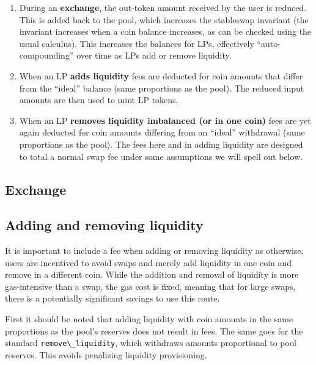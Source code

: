 \documentclass[
]{article}
\newcommand{\passthrough}[1]{#1}
\begin{document}
\begin{enumerate}
\def\labelenumi{\arabic{enumi})}
\item
  During an \textbf{exchange}, the out-token amount received by the user
  is reduced. This is added back to the pool, which increases the
  stableswap invariant (the invariant increases when a coin balance
  increases, as can be checked using the usual calculus). This increases
  the balances for LPs, effectively ``auto-compounding'' over time as
  LPs add or remove liquidity.
\item
  When an LP \textbf{adds liquidity} fees are deducted for coin amounts
  that differ from the ``ideal'' balance (same proportions as the pool).
  The reduced input amounts are then used to mint LP tokens.
\item
  When an LP \textbf{removes liquidity imbalanced (or in one coin)} fees
  are yet again deducted for coin amounts differing from an ``ideal''
  withdrawal (same proportions as the pool). The fees here and in adding
  liquidity are designed to total a normal swap fee under some
  assumptions we will spell out below.
\end{enumerate}

\hypertarget{exchange}{%
\subsection{Exchange}\label{exchange}}

\hypertarget{adding-and-removing-liquidity}{%
\subsection{Adding and removing
liquidity}\label{adding-and-removing-liquidity}}

It is important to include a fee when adding or removing liquidity as
otherwise, users are incentived to avoid swaps and merely add liquidity
in one coin and remove in a different coin. While the addition and
removal of liquidity is more gas-intensive than a swap, the gas cost is
fixed, meaning that for large swaps, there is a potentially significant
savings to use this route.

First it should be noted that adding liquidity with coin amounts in the
same proportions as the pool's reserves does not result in fees. The
same goes for the standard \passthrough{\lstinline!remove\_liquidity!},
which withdraws amounts proportional to pool reserves. This avoids
penalizing liquidity provisioning.
\end{document}
